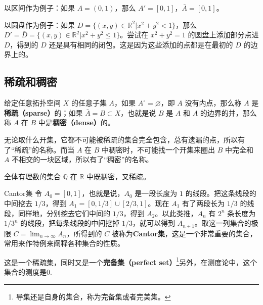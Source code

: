 以区间作为例子：如果 $A=(0,1)$，那么 $A'=[0,1]$，$\bar{A}=[0,1]$。

以圆盘作为例子：如果 $D=\{(x,y)\in\mathbb{R}^2|x^2+y^2<1\}$，那么 $D'=\bar{D}=\{(x,y)\in\mathbb{R}^2|x^2+y^2\leq1\}$。尝试在 $x^2+y^2=1$ 的圆盘上添加部分点进 $D$，得到的 $D$ 还是具有相同的闭包。这是因为这些添加的点都是在最初的 $D$ 的边界上的。

\subsection{稀疏和稠密}
给定任意拓扑空间 $X$ 的任意子集 $A$，如果 $A^\circ=\varnothing$，即 $A$ 没有内点，那么称 $A$ 是\textbf{稀疏（sparse）}的；如果 $\bar{A}=B\subset X$，也就是说 $B$ 是 $A$ 和 $A$ 的边界的并，那么称 $A$ 在 $B$ 中是\textbf{稠密（dense）}的。

无论取什么开集，它都不可能被稀疏的集合完全包含，总有遗漏的点，所以有了“稀疏”的名称。而当 $A$ 在 $B$ 中稠密时，不可能找一个开集来圈出 $B$ 中完全和 $A$ 不相交的一块区域，所以有了“稠密”的名称。

全体有理数的集合 $\mathbb{Q}$ 在 $\mathbb{R}$ 中既稠密，又稀疏。

\begin{example}{Cantor集}\label{Topo0_ex2}
令 $A_0=[0,1]$，也就是说，$A_0$ 是一段长度为 $1$ 的线段。把这条线段的中间挖去 $1/3$，得到 $A_1=[0,1/3]\cup[2/3,1]$。现在 $A_1$ 有了两段长为 $1/3$ 的线段，同样地，分别挖去它们中间的 $1/3$，得到 $A_2$。以此类推，$A_n$ 有 $2^n$ 条长度为 $1/3^n$ 的线段，把每条线段的中间挖掉 $1/3$，就可以得到 $A_{n+1}$。取这一列集合的极限 $C=\lim_{n\rightarrow\infty}A_n$，所得到的 $C$ 被称为\textbf{Cantor集}，这是一个非常重要的集合，常用来作特例来阐释各种集合的性质。

这是一个稀疏集，同时又是一个\textbf{完备集（perfect set）}\footnote{导集还是自身的集合，称为完备集或者完美集。}另外，在测度论中，这个集合的测度是0. 
\end{example}
